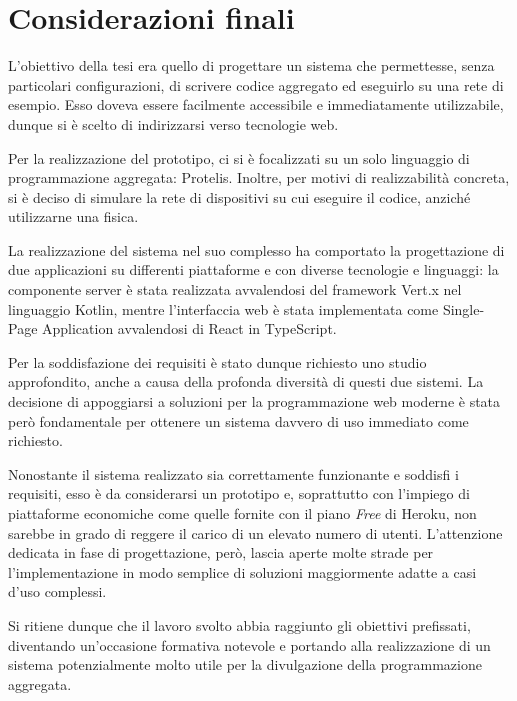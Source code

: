 \chapter{Considerazioni finali}\label{ch:considerations}
  L'obiettivo della tesi era quello di progettare un sistema che permettesse, senza particolari configurazioni,
  di scrivere codice aggregato ed eseguirlo su una rete di esempio.
  Esso doveva essere facilmente accessibile e immediatamente utilizzabile, dunque si è scelto di indirizzarsi verso tecnologie web.

  Per la realizzazione del prototipo, ci si è focalizzati su un solo linguaggio di programmazione aggregata: Protelis.
  Inoltre, per motivi di realizzabilità concreta, si è deciso di simulare la rete di dispositivi su cui eseguire il codice,
  anziché utilizzarne una fisica.

  La realizzazione del sistema nel suo complesso ha comportato la progettazione di due applicazioni su differenti piattaforme e con diverse tecnologie e linguaggi:
  la componente server è stata realizzata avvalendosi del framework Vert.x nel linguaggio Kotlin,
  mentre l'interfaccia web è stata implementata come Single-Page Application avvalendosi di React in TypeScript.

  Per la soddisfazione dei requisiti è stato dunque richiesto uno studio approfondito, anche a causa della profonda diversità di questi due sistemi.
  La decisione di appoggiarsi a soluzioni per la programmazione web moderne è stata però fondamentale per ottenere un sistema davvero di uso immediato come richiesto.

  Nonostante il sistema realizzato sia correttamente funzionante e soddisfi i requisiti, esso è da considerarsi un prototipo e, soprattutto con l'impiego di piattaforme economiche come quelle fornite con il piano \emph{Free} di Heroku, non sarebbe in grado di reggere il carico di un elevato numero di utenti.
  L'attenzione dedicata in fase di progettazione, però, lascia aperte molte strade per l'implementazione in modo semplice di soluzioni maggiormente adatte a casi d'uso complessi.

  Si ritiene dunque che il lavoro svolto abbia raggiunto gli obiettivi prefissati, diventando un'occasione formativa notevole e portando alla realizzazione di un sistema potenzialmente molto utile per la divulgazione della programmazione aggregata.
